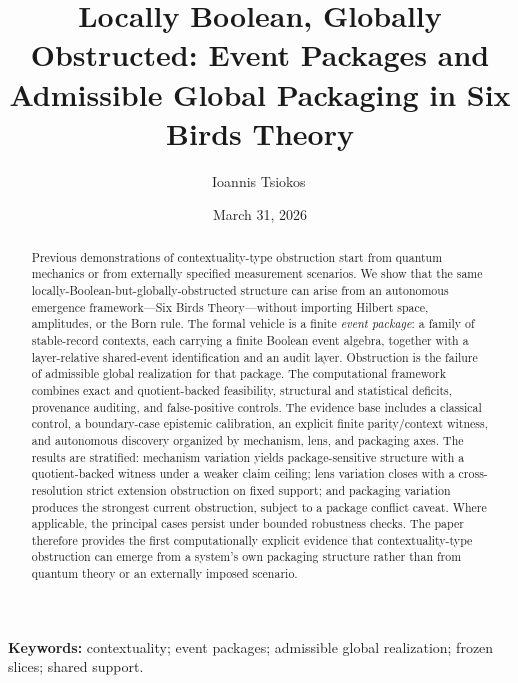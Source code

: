 \documentclass[11pt]{article}
\title{Locally Boolean, Globally Obstructed: Event Packages and Admissible Global Packaging in Six Birds Theory}
\author{Ioannis Tsiokos\,\orcidlink{0009-0009-7659-5964}}
\date{March 31, 2026}
\theoremstyle{definition}
\begin{document}
\maketitle
\thispagestyle{firstpage}

\begin{abstract}
Previous demonstrations of contextuality-type obstruction start from quantum mechanics or from externally specified measurement scenarios. We show that the same locally-Boolean-but-globally-obstructed structure can arise from an autonomous emergence framework---Six Birds Theory---without importing Hilbert space, amplitudes, or the Born rule. The formal vehicle is a finite \emph{event package}: a family of stable-record contexts, each carrying a finite Boolean event algebra, together with a layer-relative shared-event identification and an audit layer. Obstruction is the failure of admissible global realization for that package. The computational framework combines exact and quotient-backed feasibility, structural and statistical deficits, provenance auditing, and false-positive controls. The evidence base includes a classical control, a boundary-case epistemic calibration, an explicit finite parity/context witness, and autonomous discovery organized by mechanism, lens, and packaging axes. The results are stratified: mechanism variation yields package-sensitive structure with a quotient-backed witness under a weaker claim ceiling; lens variation closes with a cross-resolution strict extension obstruction on fixed support; and packaging variation produces the strongest current obstruction, subject to a package conflict caveat. Where applicable, the principal cases persist under bounded robustness checks. The paper therefore provides the first computationally explicit evidence that contextuality-type obstruction can emerge from a system's own packaging structure rather than from quantum theory or an externally imposed scenario.
\end{abstract}

\medskip
\noindent\textbf{Keywords:} contextuality; event packages; admissible global realization; frozen slices; shared support.
\end{document}
